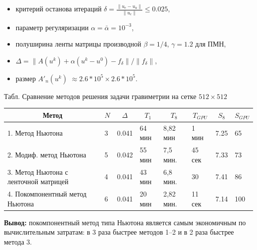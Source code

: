 \documentclass[10pt,pdf, mathserif, hyperref={unicode}]{beamer}
\begin{document}
\begin{frame}
\begin{itemize}
	\item критерий останова итераций $\delta=\frac{\|u_e-u_a\|}{\|u_e\|}\leqslant 0.025$,
	\item параметр регуляризации $\alpha=\bar{\alpha}=10^{-3}$,
	\item полуширина ленты матрицы производной $\beta=1/4$, $\gamma=1.2$ для ПМН,
	\item $\Delta=\|A(u^k)+\alpha(u^k-u^0)-f_\delta\|/\|f_\delta\|$,
	\item размер $A'_n(u^k)$  $\approx 2.6*10^5\times2.6*10^5$.
\end{itemize}
	
	\begin{table}[]
		\centering
		\renewcommand{\arraystretch}{1.5}
		\scriptsize{Табл. Сравнение методов решения задачи гравиметрии на сетке $512\times512$}
		\label{table3.1}
		\begin{tabular}{|p{}|l|l|l|l|l|l|l|}
			\hline
			\multicolumn{1}{|c|}{Метод}        & \multicolumn{1}{c|}{$N$} &
			\multicolumn{1}{c|}{$\Delta$} & \multicolumn{1}{c|}{$T_1$} & \multicolumn{1}{c|}{$T_8$} &
			\multicolumn{1}{c|}{$T_{GPU}$} &
			\multicolumn{1}{c|}{$S_8$} & \multicolumn{1}{c|}{$S_{GPU}$}
			\\ \hline
			1. Метод Ньютона                      &  3        & 0.041                          &       64 мин                  &     8,82 мин &
			1 мин & 7.25 & 65 \\ \hline
			2. Модиф. метод Ньютона     &         5           & 0.042            & 55 мин                  & 7,5 мин.    &
			45 сек & 7.33 & 73             \\ \hline
			3. Метод Ньютона с ленточной матрицей &  4               & 0.041                    & 43 мин                  & 6,8 мин. & 30   & 7.41 & 86        \\ \hline
			\rowcolor{Green}
			4. Покомпонентный метод Ньютона &  6               & 0.041                    & 20 мин  & 2,82 мин.  &  11 сек   & 7.14 & 100            \\ \hline
		\end{tabular}
	\end{table}
	\textbf{\color{blue}Вывод:} покомпонентный метод типа Ньютона является самым экономичным по вычислительным затратам: в 3 раза быстрее методов 1--2 и в 2 раза быстрее метода 3.
\end{frame}
\end{document}
